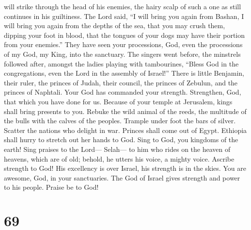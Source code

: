 will strike through the head of his enemies, the hairy scalp of such a
one as still continues in his guiltiness.  The Lord said,
``I will bring you again from Bashan, I will bring you again from the
depths of the sea,  that you may crush them, dipping your
foot in blood, that the tongues of your dogs may have their portion from
your enemies.''  They have seen your processions, God, even
the processions of my God, my King, into the sanctuary. 
The singers went before, the minstrels followed after, amongst the
ladies playing with tambourines,  ``Bless God in the
congregations, even the Lord in the assembly of Israel!'' 
There is little Benjamin, their ruler, the princes of Judah, their
council, the princes of Zebulun, and the princes of Naphtali.
 Your God has commanded your strength. Strengthen, God,
that which you have done for us.  Because of your temple at
Jerusalem, kings shall bring presents to you.  Rebuke the
wild animal of the reeds, the multitude of the bulls with the calves of
the peoples. Trample under foot the bars of silver. Scatter the nations
who delight in war.  Princes shall come out of Egypt.
Ethiopia shall hurry to stretch out her hands to God.  Sing
to God, you kingdoms of the earth! Sing praises to the Lord--- Selah---
 to him who rides on the heaven of heavens, which are of
old; behold, he utters his voice, a mighty voice.  Ascribe
strength to God! His excellency is over Israel, his strength is in the
skies.  You are awesome, God, in your sanctuaries. The God
of Israel gives strength and power to his people. Praise be to God!

\hypertarget{section-67}{%
\section{69}\label{section-67}}

